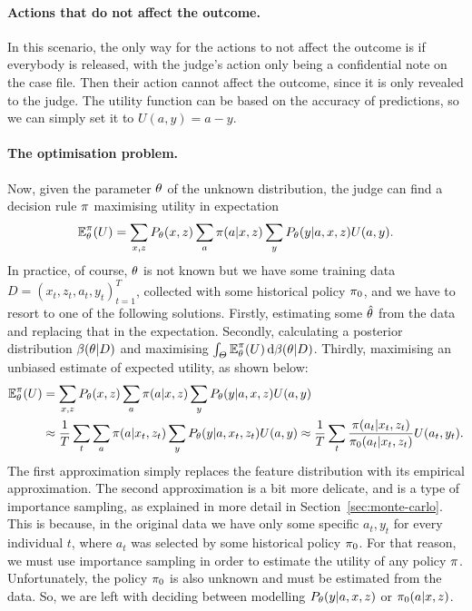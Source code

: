 \begin{frame}
{    \paragraph{Actions that do not affect the outcome.} In this
    scenario, the only way for the actions to not affect the outcome
    is if everybody is released, with the judge's action only being a
    confidential note on the case file. Then their action cannot
    affect the outcome, since it is only revealed to the judge. The
    utility function can be based on the accuracy of predictions, so
    we can simply set it to $U(a,y) = a - y$.
    
    \paragraph{The optimisation problem.} Now, given the parameter $\theta$ of the unknown distribution, the judge can find a decision rule $\pi$ maximising utility in expectation
    \begin{equation}
      \label{eq:expected-utility-judge}
      \mathop{\mbox{\ensuremath{\mathbb{E}}}}\nolimits_\theta^\pi(U) = \sum_{x,z} P_\theta(x, z) \sum_a \pi(a | x, z) \sum_y P_\theta(y | a, x, z) U(a,y).
    \end{equation}
    In practice, of course, $\theta$ is not known but we have some training data $D = (x_t, z_t, a_t, y_t)_{t=1}^T$, collected with some historical policy $\pi_0$, and  we have to resort to one of the following solutions. Firstly, estimating some $\hat{\theta}$ from the data and replacing that in the expectation. Secondly, calculating a posterior distribution $\beta(\theta | D)$ and maximising $\int_\Theta \mathop{\mbox{\ensuremath{\mathbb{E}}}}\nolimits_\theta^\pi(U) \,\mathrm{d} \beta(\theta | D)$. Thirdly, maximising an unbiased estimate of expected utility, as shown below:
    \begin{align*}
      \mathop{\mbox{\ensuremath{\mathbb{E}}}}\nolimits^\pi_\theta(U)
      &=
        \sum_{x,z} P_\theta(x, z) \sum_a \pi(a | x, z) \sum_y P_\theta(y | a, x, z) U(a,y) \\
      &\approx
        \frac{1}{T} \sum_{t} \sum_a \pi(a | x_t, z_t) \sum_y P_\theta(y | a, x_t, z_t) U(a,y)
        \approx
        \frac{1}{T} \sum_{t} \frac{\pi(a_t | x_t, z_t)}{\pi_0(a_t | x_t, z_t)} U(a_t,y_t).
    \end{align*}
    The first approximation simply replaces the feature distribution with its empirical approximation.
    The second approximation is a bit more delicate, and is a type of importance sampling, as explained in more detail in Section~\ref{sec:monte-carlo}.
    This is because, in the original data we have only some specific $a_t, y_t$ for every individual $t$, where $a_t$ was selected by some historical policy $\pi_0$. For that reason, we must use importance sampling in order to estimate the utility of any policy $\pi$. Unfortunately, the policy $\pi_0$ is also unknown and must be estimated from the data. So, we are left with deciding between modelling $P_\theta(y | a, x, z)$ or $\pi_0(a | x, z)$.

}
\end{frame}
